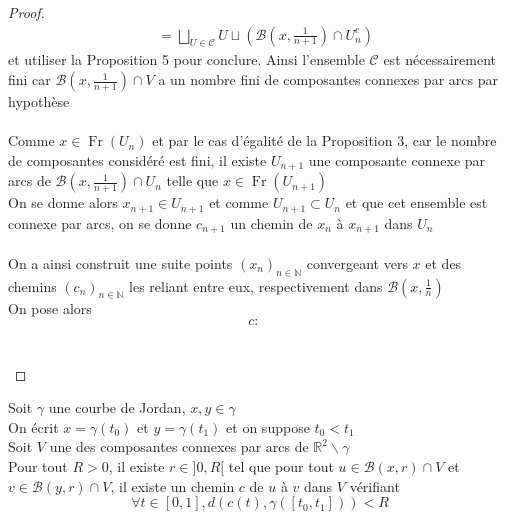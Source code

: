 \documentclass{article}
\begin{document}
\begin{flushleft}
\begin{proof}
\begin{align*}
        &= \bigsqcup_{U \in \mathcal{C}} U \sqcup \left(\mathcal{B}\left(x, \frac{1}{n+1}\right) \cap U_n^c\right)
    \end{align*}
    et utiliser la Proposition 5 pour conclure. Ainsi l'ensemble $\mathcal{C}$ est nécessairement fini car
    $\mathcal{B}(x, \frac{1}{n+1}) \cap V$ a un nombre fini de composantes connexes par arcs par hypothèse
    \\~\\
    Comme $x \in \operatorname{Fr}(U_n)$ et par le cas d'égalité de la Proposition 3, car le nombre de composantes
    considéré est fini, il existe $U_{n+1}$ une composante connexe par arcs de $\mathcal{B}(x, \frac{1}{n+1}) \cap U_n$
    telle que $x \in \operatorname{Fr}(U_{n+1})$\\
    On se donne alors $x_{n+1} \in U_{n+1}$ et comme $U_{n+1} \subset U_n$ et que cet ensemble est connexe par arcs,
    on se donne $c_{n+1}$ un chemin de $x_n$ à $x_{n+1}$ dans $U_n$
    \\~\\
    On a ainsi construit une suite points $(x_n)_{n \in \mathbb{N}}$ convergeant vers $x$ et des chemins
    $(c_n)_{n \in \mathbb{N}}$ les reliant entre eux, respectivement dans $\mathcal{B}(x, \frac{1}{n})$\\
    On pose alors
    \[ c : \begin{array}{cl}
    \end{array} \]
    \\~\\
\end{proof}

\begin{tcolorbox}[colback = purple!20!white, colframe = purple!60!white, title = Proposition 7]
    Soit $\gamma$ une courbe de Jordan, $x, y \in \gamma$\\
    On écrit $x = \gamma(t_0)$ et $y = \gamma(t_1)$ et on suppose $t_0 < t_1$\\
    Soit $V$ une des composantes connexes par arcs de $\mathbb{R}^2 \backslash \gamma$\\
    Pour tout $R > 0$, il existe $r \in ]0, R[$ tel que pour tout
    $u \in \mathcal{B}(x, r) \cap V$ et $v \in \mathcal{B}(y, r) \cap V$,
    il existe un chemin $c$ de $u$ à $v$ dans $V$ vérifiant
    \[ \forall t \in [0, 1], d(c(t), \gamma([t_0, t_1])) < R \]
\end{tcolorbox}


\end{flushleft}
\end{document}
